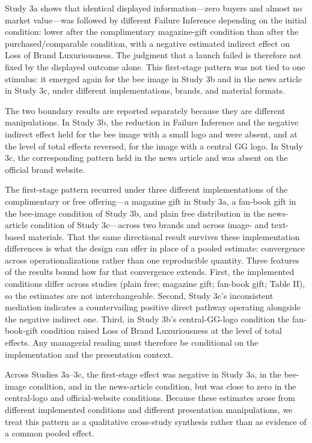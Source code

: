 \documentclass[12pt, a4paper]{article}
\begin{document}
Study 3a shows that identical displayed information---zero buyers and almost no market value---was followed by different Failure Inference depending on the initial condition: lower after the complimentary magazine-gift condition than after the purchased/comparable condition, with a negative estimated indirect effect on Loss of Brand Luxuriousness. The judgment that a launch failed is therefore not fixed by the displayed outcome alone. This first-stage pattern was not tied to one stimulus: it emerged again for the bee image in Study 3b and in the news article in Study 3c, under different implementations, brands, and material formats.

The two boundary results are reported separately because they are different manipulations. In Study 3b, the reduction in Failure Inference and the negative indirect effect held for the bee image with a small logo and were absent, and at the level of total effects reversed, for the image with a central GG logo. In Study 3c, the corresponding pattern held in the news article and was absent on the official brand website.

The first-stage pattern recurred under three different implementations of the complimentary or free offering---a magazine gift in Study 3a, a fan-book gift in the bee-image condition of Study 3b, and plain free distribution in the news-article condition of Study 3c---across two brands and across image- and text-based materials. That the same directional result survives these implementation differences is what the design can offer in place of a pooled estimate: convergence across operationalizations rather than one reproducible quantity. Three features of the results bound how far that convergence extends. First, the implemented conditions differ across studies (plain free; magazine gift; fan-book gift; Table II), so the estimates are not interchangeable. Second, Study 3c's inconsistent mediation indicates a countervailing positive direct pathway operating alongside the negative indirect one. Third, in Study 3b's central-GG-logo condition the fan-book-gift condition raised Loss of Brand Luxuriousness at the level of total effects. Any managerial reading must therefore be conditional on the implementation and the presentation context.

Across Studies 3a--3c, the first-stage effect was negative in Study 3a, in the bee-image condition, and in the news-article condition, but was close to zero in the central-logo and official-website conditions. Because these estimates arose from different implemented conditions and different presentation manipulations, we treat this pattern as a qualitative cross-study synthesis rather than as evidence of a common pooled effect.
\end{document}
